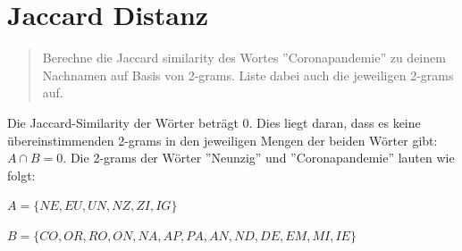 \section{Jaccard Distanz}
\begin{quote}
    Berechne die Jaccard similarity des Wortes ''Coronapandemie'' zu deinem Nachnamen auf Basis von 2-grams. Liste dabei auch die jeweiligen 2-grams auf.
\end{quote}
Die Jaccard-Similarity der Wörter beträgt 0. Dies liegt daran, dass es keine übereinstimmenden 2-grams in den jeweiligen Mengen der beiden Wörter gibt: $A \cap B = 0$. Die 2-grams der Wörter ''Neunzig'' und ''Coronapandemie'' lauten wie folgt:

$A = \{NE, EU, UN, NZ, ZI, IG\}$

$B = \{CO, OR, RO, ON, NA, AP, PA, AN, ND, DE, EM, MI, IE\}$


